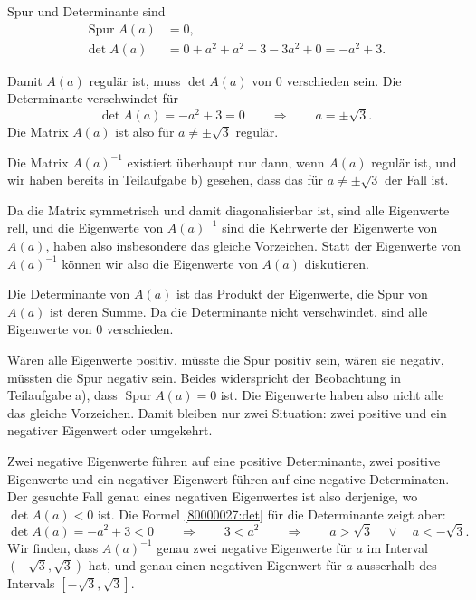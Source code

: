 \begin{loesung}
\begin{teilaufgaben}
\item Spur und Determinante sind
\begin{align}
\operatorname{Spur} A(a)
&=
0,
\label{80000027:tr}
\\
\det A(a)
&=
0 + a^2 + a^2 + 3 - 3 a^2 + 0
=
-a^2+3.
\label{80000027:det}
\end{align}
\item
Damit $A(a)$ regulär ist, muss $\det A(a)$
von $0$ verschieden sein.
Die Determinante verschwindet für
\[
\det A(a)
=
-a^2+3
=
0
\qquad
\Rightarrow
\qquad
a=\pm\sqrt{3}.
\]
Die Matrix $A(a)$ ist also für $a\ne\pm\sqrt{3}$ regulär.
\item
Die Matrix $A(a)^{-1}$ existiert überhaupt nur dann, wenn $A(a)$
regulär ist, und wir haben bereits in Teilaufgabe b) gesehen, dass
das für $a\ne\pm\sqrt{3}$ der Fall ist.

Da die Matrix symmetrisch und damit diagonalisierbar ist, sind alle
Eigenwerte rell, und die Eigenwerte von $A(a)^{-1}$ sind die
Kehrwerte der Eigenwerte von $A(a)$, haben also insbesondere
das gleiche Vorzeichen.
Statt der Eigenwerte von $A(a)^{-1}$ können wir also die Eigenwerte
von $A(a)$ diskutieren.

Die Determinante von $A(a)$ ist das Produkt der Eigenwerte, die Spur
von $A(a)$ ist deren Summe.
Da die Determinante nicht verschwindet, sind alle Eigenwerte von $0$
verschieden.

Wären alle Eigenwerte positiv, müsste die Spur positiv sein,
wären sie negativ, müssten die Spur negativ sein.
Beides widerspricht der Beobachtung in Teilaufgabe a), dass 
$\operatorname{Spur}A(a)=0$ ist.
Die Eigenwerte haben also nicht alle das gleiche Vorzeichen.
Damit bleiben nur zwei Situation: zwei positive und ein negativer
Eigenwert oder umgekehrt.

Zwei negative Eigenwerte führen auf eine positive Determinante,
zwei positive Eigenwerte und ein negativer Eigenwert führen auf
eine negative Determinaten.
Der gesuchte Fall genau eines negativen Eigenwertes ist also derjenige,
wo $\det A(a) <0$ ist.
Die Formel \eqref{80000027:det} für die Determinante zeigt aber:
\[
\det A(a) = -a^2 + 3 < 0
\qquad\Rightarrow\qquad
3 < a^2
\qquad\Rightarrow\qquad
a >\sqrt{3}\quad\vee\quad a < -\sqrt{3}.
\]
Wir finden, dass $A(a)^{-1}$ genau zwei negative Eigenwerte für $a$ im Interval
$(-\sqrt{3},\sqrt{3})$ hat, und genau einen negativen Eigenwert für
$a$ ausserhalb des Intervals $[-\sqrt{3},\sqrt{3}]$.
\qedhere
\end{teilaufgaben}
\end{loesung}

